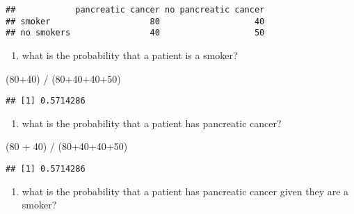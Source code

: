 \documentclass[
]{article}
\newenvironment{Shaded}{\begin{snugshade}}{\end{snugshade}}
\newcommand{\DecValTok}[1]{\textcolor[rgb]{0.00,0.00,0.81}{#1}}
\newcommand{\NormalTok}[1]{#1}
\newcommand{\SpecialCharTok}[1]{\textcolor[rgb]{0.00,0.00,0.00}{#1}}
\providecommand{\tightlist}{%
  \setlength{\itemsep}{0pt}\setlength{\parskip}{0pt}}
\begin{document}
\begin{verbatim}
##            pancreatic cancer no pancreatic cancer
## smoker                    80                   40
## no smokers                40                   50
\end{verbatim}

\begin{enumerate}
\def\labelenumi{\alph{enumi})}
\tightlist
\item
  what is the probability that a patient is a smoker?
\end{enumerate}

\begin{Shaded}
\begin{Highlighting}[]
\NormalTok{(}\DecValTok{80}\SpecialCharTok{+}\DecValTok{40}\NormalTok{) }\SpecialCharTok{/}\NormalTok{ (}\DecValTok{80}\SpecialCharTok{+}\DecValTok{40}\SpecialCharTok{+}\DecValTok{40}\SpecialCharTok{+}\DecValTok{50}\NormalTok{)}
\end{Highlighting}
\end{Shaded}

\begin{verbatim}
## [1] 0.5714286
\end{verbatim}

\begin{enumerate}
\def\labelenumi{\alph{enumi})}
\setcounter{enumi}{1}
\tightlist
\item
  what is the probability that a patient has pancreatic cancer?
\end{enumerate}

\begin{Shaded}
\begin{Highlighting}[]
\NormalTok{(}\DecValTok{80} \SpecialCharTok{+} \DecValTok{40}\NormalTok{) }\SpecialCharTok{/}\NormalTok{ (}\DecValTok{80}\SpecialCharTok{+}\DecValTok{40}\SpecialCharTok{+}\DecValTok{40}\SpecialCharTok{+}\DecValTok{50}\NormalTok{)}
\end{Highlighting}
\end{Shaded}

\begin{verbatim}
## [1] 0.5714286
\end{verbatim}

\begin{enumerate}
\def\labelenumi{\alph{enumi})}
\setcounter{enumi}{2}
\tightlist
\item
  what is the probability that a patient has pancreatic cancer given
  they are a smoker?
\end{enumerate}
\end{document}
